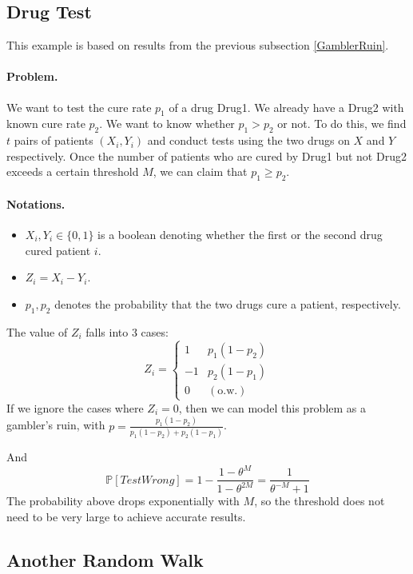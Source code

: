     \subsection{Drug Test}\label{DrugTest}
    This example is based on results from the previous subsection \ref{GamblerRuin}.
    \paragraph*{Problem.} We want to test the cure rate $p_1$ of a drug \textrm{Drug}1. We already have a \textrm{Drug}2 with known cure rate $p_2$. We want to know whether $p_1 > p_2$ or not. To do this, we find $t$ pairs of patients $(X_i, Y_i)$ and conduct tests using the two drugs on $X$ and $Y$ respectively. Once the number of patients who are cured by \textrm{Drug}1 but not \textrm{Drug}2 exceeds a certain threshold $M$, we can claim that $p_1 \ge p_2$.
    \paragraph*{Notations.}
    \begin{itemize}
        \item $X_i,Y_i \in \{0,1\}$ is a boolean denoting whether the first or the second drug cured patient $i$.
        \item $Z_i = X_i - Y_i$.
        \item $p_1, p_2$ denotes the probability that the two drugs cure a patient, respectively.
    \end{itemize}

    The value of $Z_i$ falls into 3 cases:
    \[ Z_i = 
        \begin{cases}
            1 &p_1(1-p_2)\\
            -1 &p_2(1-p_1)\\
            0 &(\text{o.w.})
        \end{cases}
    \]
    If we ignore the cases where $Z_i = 0$, then we can model this problem as a gambler's ruin, with $p = \frac{p_1(1-p_2)}{p_1(1-p_2)+p_2(1-p_1)}$.

    And
    \[ \mathbb{P}[TestWrong] = 1 - \frac{1-\theta^M}{1-\theta^{2M}} = \frac{1}{\theta^{-M} + 1} \]
    The probability above drops exponentially with $M$, so the threshold does not need to be very large to achieve accurate results.

    \subsection{Another Random Walk}\label{AnotherRandWalk}
